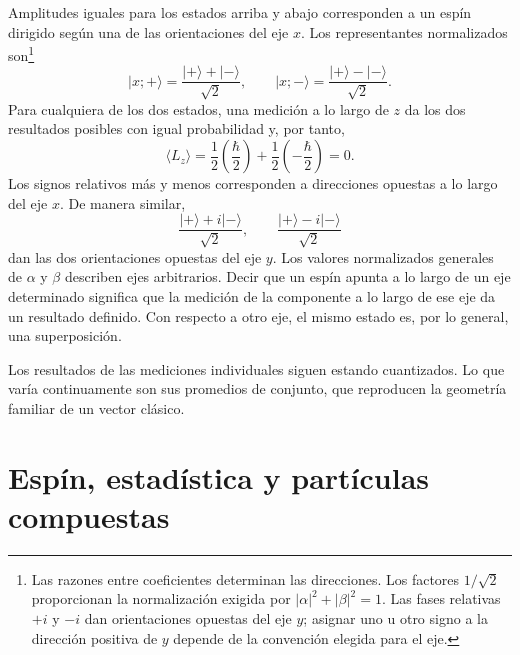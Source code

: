 Amplitudes iguales para los estados arriba y abajo corresponden a un espín dirigido según una de las orientaciones del eje \(x\). Los representantes normalizados son\footnote{Las razones entre coeficientes determinan las direcciones. Los factores \(1/\sqrt2\) proporcionan la normalización exigida por \( |\alpha|^2+|\beta|^2=1\). Las fases relativas \(+i\) y \(-i\) dan orientaciones opuestas del eje \(y\); asignar uno u otro signo a la dirección positiva de \(y\) depende de la convención elegida para el eje.}
\begin{equation}
\lvert x;+\rangle
=
\frac{\lvert+\rangle+\lvert-\rangle}{\sqrt2},
\qquad
\lvert x;-\rangle
=
\frac{\lvert+\rangle-\lvert-\rangle}{\sqrt2}.
\end{equation}
Para cualquiera de los dos estados, una medición a lo largo de \(z\) da los dos resultados posibles con igual probabilidad y, por tanto,
\begin{equation}
\langle L_z\rangle
=
\frac12\left(\frac{\hbar}{2}\right)
+
\frac12\left(-\frac{\hbar}{2}\right)
=0.
\end{equation}
Los signos relativos más y menos corresponden a direcciones opuestas a lo largo del eje \(x\). De manera similar,
\begin{equation}
\frac{\lvert+\rangle+i\lvert-\rangle}{\sqrt2},
\qquad
\frac{\lvert+\rangle-i\lvert-\rangle}{\sqrt2}
\end{equation}
dan las dos orientaciones opuestas del eje \(y\). Los valores normalizados generales de \(\alpha\) y \(\beta\) describen ejes arbitrarios. Decir que un espín apunta a lo largo de un eje determinado significa que la medición de la componente a lo largo de ese eje da un resultado definido. Con respecto a otro eje, el mismo estado es, por lo general, una superposición.

Los resultados de las mediciones individuales siguen estando cuantizados. Lo que varía continuamente son sus promedios de conjunto, que reproducen la geometría familiar de un vector clásico.

\section{Espín, estadística y partículas compuestas}


